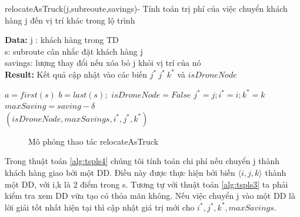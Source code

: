 \documentclass[a4paper,12pt]{report}
\begin{document}
\begin{algorithm}[H]
\caption{relocateAsTruck(j,subreoute,savings)- Tính toán trị phí của việc chuyển khách hàng j đến vị trí khác trong lộ trình}
\textbf{Data:} j : khách hàng trong TD\\ s: subroute cân nhắc đặt khách hàng j \\ savings: lượng thay đổi nếu xóa bỏ j khỏi vị trí của nó\\

\textbf{Result:} Kết quả cập nhật vào các biến $j^* \ j^* \ k^*$ và $isDroneNode$
\begin{algorithmic}[1]
\State $a=first(s)$
\State $b=last(s);$
\State $isDroneNode=False$
\State $j^*=j;i^*=i;k^*=k$
\State $maxSaving=saving-\delta$
\EndIf
\EndIf
\EndIf
\EndIf
\EndFor\\
\Return 	$(isDroneNode,maxSavings,i^*,j^*,k^*)$
\end{algorithmic}

\label{alg:tspls3}
\end{algorithm}
\begin{figure}[H]

\caption{Mô phỏng thao tác relocateAsTruck}\label{reloAsTruck}
\end{figure}
Trong thuật toán \ref{alg:tspls4} chúng tôi tính toán chi phí nếu chuyển j thành khách hàng giao bởi một DD. Điều này được thực hiện bởi biến $\langle i,j,k \rangle$ thành một DD, với i,k là 2 điểm trong s. Tương tự với thuật toán \ref{alg:tspls3} ta phải kiểm tra xem DD vừa tạo có thỏa mãn không. Nếu việc chuyển j vào một DD là lời giải tốt nhất hiện tại thì cập nhật  giá trị mới cho $i^*,j^*,k^*, maxSavings$.\\
\end{document}
